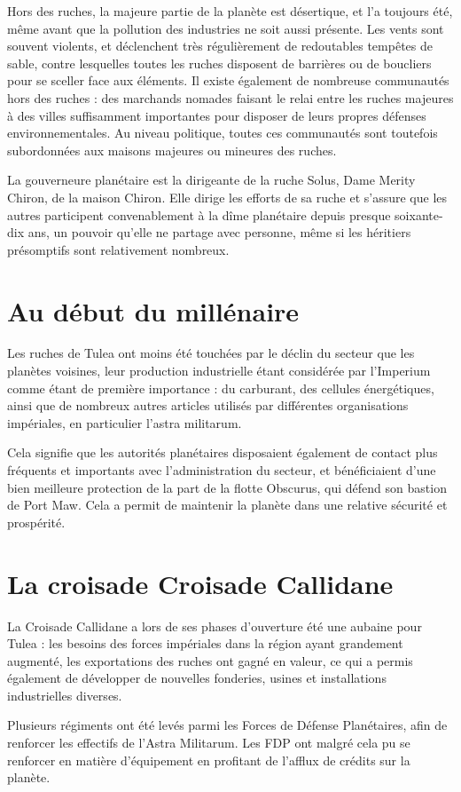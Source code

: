 \documentclass[10pt,a4paper]{book}
\newcommand{\croisade}{Croisade Callidane }
\newcommand{\zone}{Tulea }
\begin{document}
Hors des ruches, la majeure partie de la planète est désertique, et l'a toujours été, même avant que la pollution des industries ne soit aussi présente. Les vents sont souvent violents, et déclenchent très régulièrement de redoutables tempêtes de sable, contre lesquelles toutes les ruches disposent de barrières ou de boucliers pour se sceller face aux éléments. Il existe également de nombreuse communautés hors des ruches : des marchands nomades faisant le relai entre les ruches majeures à des villes suffisamment importantes pour disposer de leurs propres défenses environnementales. Au niveau politique, toutes ces communautés sont toutefois subordonnées aux maisons majeures ou mineures des ruches.

La gouverneure planétaire est la dirigeante de la ruche Solus, Dame Merity Chiron, de la maison Chiron. Elle dirige les efforts de sa ruche et s'assure que les autres participent convenablement à la dîme planétaire depuis presque soixante-dix ans, un pouvoir qu'elle ne partage avec personne, même si les héritiers présomptifs sont relativement nombreux.
\section{Au début du millénaire}
Les ruches de \zone ont moins été touchées par le déclin du secteur que les planètes voisines, leur production industrielle étant considérée par l'Imperium comme étant de première importance : du carburant, des cellules énergétiques, ainsi que de nombreux autres articles utilisés par différentes organisations impériales, en particulier l'astra militarum.

Cela signifie que les autorités planétaires disposaient également de contact plus fréquents et importants avec l'administration du secteur, et bénéficiaient d'une bien meilleure protection de la part de la flotte Obscurus, qui défend son bastion de Port Maw. Cela a permit de maintenir la planète dans une relative sécurité et prospérité. 
\section{La croisade \croisade}
La \croisade a lors de ses phases d'ouverture été une aubaine pour \zone : les besoins des forces impériales dans la région ayant grandement augmenté, les exportations des ruches ont gagné en valeur, ce qui a permis également de développer de nouvelles fonderies, usines et installations industrielles diverses. 

Plusieurs régiments ont été levés parmi les Forces de Défense Planétaires, afin de renforcer les effectifs de l'Astra Militarum. Les FDP ont malgré cela pu se renforcer en matière d'équipement en profitant de l'afflux de crédits sur la planète. 
\end{document}
